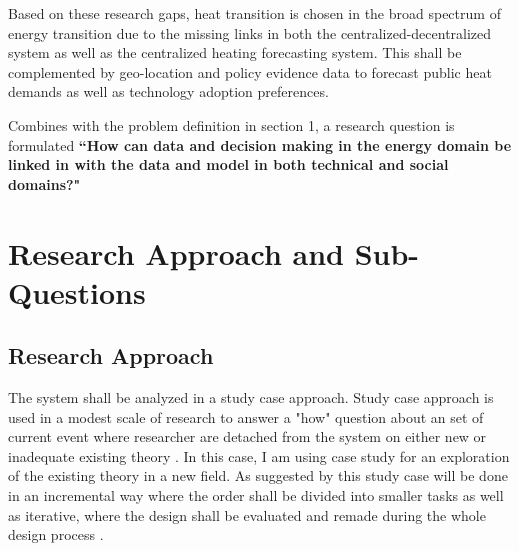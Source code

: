 Based on these research gaps, heat transition is chosen in the broad spectrum of energy transition due to the missing links in both the centralized-decentralized system as well as the centralized heating forecasting system. This shall be complemented by geo-location and policy evidence data to forecast public heat demands as well as technology adoption preferences.

Combines with the problem definition in section 1, a research question is formulated \textbf{“How can data and decision making in the energy domain be linked in with the data and model in both technical and social domains?"}


\section{Research Approach and Sub-Questions}

\subsection{Research Approach}


The system shall be analyzed in a study case approach. Study case approach is used in a modest scale of research \citep{Rowley2002UsingResearch} to answer a "how" question about an set of current event where researcher are detached from the system \citep{Yin1994DiscoveringResearch} on either new or inadequate existing theory \citep{Eisenhardt1989BuildingResearch}. In this case, I am using case study for an exploration of the existing theory in a new field. As suggested by \citep{Eisenhardt1989BuildingResearch} this study case will be done in an incremental way where the order shall be divided into smaller tasks as well as iterative, where the design shall be evaluated and remade during the whole design process \citep{Cockburn1998UsingDevelopment}. 

